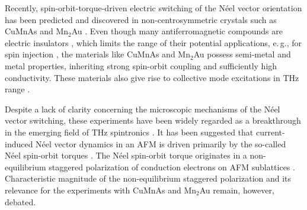 Recently, spin-orbit-torque-driven electric switching of the N\'eel vector orientation has been predicted \cite{zelezny_relativistic_2014} and discovered in non-centrosymmetric crystals such as CuMnAs \cite{wadley_electrical_2016, fina_electric_2017, zelezny_spin_2018, saidl_optical_2017} and Mn$_2$Au \cite{barthem_revealing_2013, jourdan_epitaxial_2015, bhattacharjee_neel_2018}. Even though many antiferromagnetic compounds are electric insulators \cite{pandey_doping_2017}, which limits the range of their potential applications, e.\,g., for spin injection \cite{tshitoyan_electrical_2015}, the materials like CuMnAs and Mn$_2$Au possess  semi-metal and metal properties, inheriting strong spin-orbit coupling and sufficiently high conductivity. These materials also give rise to collective mode excitations in THz range \cite{bhattacharjee_neel_2018}. 

Despite a lack of clarity concerning the microscopic mechanisms of the N\'eel vector switching, these experiments have been widely regarded as a breakthrough in the emerging field of THz spintronics \cite{bhattacharjee_neel_2018, gomonay_high_2016, olejnik_terahertz_2018, jungwirth_multiple_2018, wadley_electrical_2016, jungwirth_antiferromagnetic_2016, baltz_antiferromagnetic_2018, jungfleisch_perspectives_2018}. It has been suggested that current-induced N\'eel vector dynamics in an AFM is driven primarily by the so-called N\'eel spin-orbit torques \cite{brataas_current-induced_2012, Hals2013, zelezny_relativistic_2014, freimuth_spin-orbit_2014, ghosh_spin-orbit_2017, smejkal_electric_2017, zelezny_spin_2018, zhou_strong_2018, manchon_current-induced_2019, moriyama_spin-orbit-torque_2018, li_manipulation_2019, chen_electric_2019, zhou_fieldlike_2019, zhou_large_2019, bodnar_writing_2018}. The N\'eel spin-orbit torque originates in a non-equilibrium staggered polarization of conduction electrons on AFM sublattices \cite{zelezny_relativistic_2014, smejkal_electric_2017, zelezny_spin_2018, manchon_current-induced_2019}. Characteristic magnitude of the non-equilibrium staggered polarization and its relevance for the experiments with CuMnAs and Mn$_2$Au remain, however, debated. 

